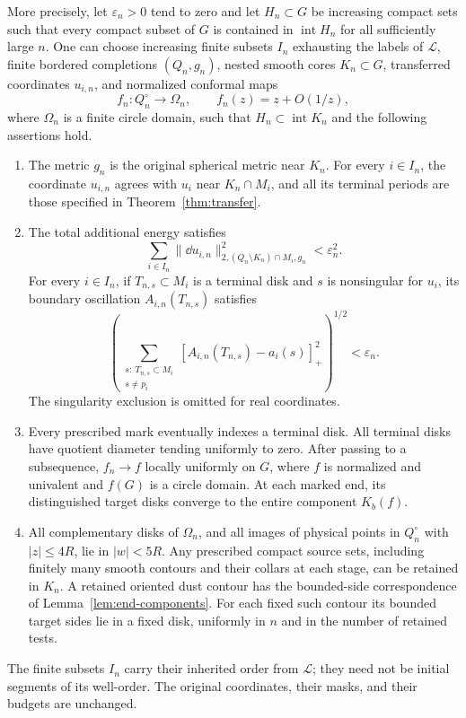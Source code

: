\begin{theorem}
More precisely, let $\varepsilon_n>0$ tend to zero and let
$H_n\subset G$ be increasing compact sets such that every compact subset
of $G$ is contained in $\operatorname{int}H_n$ for all sufficiently
large $n$.  One can choose increasing finite subsets $I_n$ exhausting
the labels of $\mathscr L$, finite bordered completions $(Q_n,g_n)$,
nested smooth cores $K_n\subset G$, transferred coordinates $u_{i,n}$,
and normalized conformal maps
\[
 f_n:Q_n^\circ\longrightarrow\Omega_n,
 \qquad f_n(z)=z+O(1/z),
\]
where $\Omega_n$ is a finite circle domain, such that $H_n\subset
\operatorname{int}K_n$ and the following assertions hold.
\begin{enumerate}[label=\textup{(\roman*)}]
\item The metric $g_n$ is the original spherical metric near $K_n$.
For every $i\in I_n$, the coordinate $u_{i,n}$ agrees with $u_i$ near
$K_n\cap M_i$, and all its terminal periods are those specified in
Theorem~\ref{thm:transfer}.
\item The total additional energy satisfies
\begin{equation}\label{eq:retained-total-tail}
 \sum_{i\in I_n}
 \|\dd u_{i,n}\|_{2,(Q_n\setminus K_n)\cap M_i,g_n}^2
 <\varepsilon_n^2.
\end{equation}
For every $i\in I_n$, if $T_{n,s}\subset M_i$ is a terminal disk
and $s$ is nonsingular for $u_i$,
its boundary oscillation $A_{i,n}(T_{n,s})$ satisfies
\begin{equation}\label{eq:retained-excess-oscillation}
 \left(\sum_{\substack{s:\ T_{n,s}\subset M_i\\s\ne p_i}}
 [A_{i,n}(T_{n,s})-a_i(s)]_+^2\right)^{1/2}
 <\varepsilon_n.
\end{equation}
The singularity exclusion is omitted for real coordinates.
\item Every prescribed mark eventually indexes a terminal disk.
All terminal disks have quotient diameter tending uniformly to zero.
After passing to a subsequence, $f_n\to f$ locally uniformly on $G$,
where $f$ is normalized and univalent and $f(G)$ is a circle domain.
At each marked end, its distinguished target disks converge to the
entire component $K_b(f)$.
\item All complementary disks of $\Omega_n$, and all images of
physical points in $Q_n^\circ$ with $|z|\le4R$, lie in $|w|<5R$.  Any prescribed
compact source sets, including finitely many smooth contours and
their collars at each stage, can be retained in $K_n$.  A retained
oriented dust contour has the bounded-side correspondence of
Lemma~\ref{lem:end-components}.  For each fixed such contour its
bounded target sides lie in a fixed disk, uniformly in $n$ and in
the number of retained tests.
\end{enumerate}
The finite subsets $I_n$ carry their inherited order from
$\mathscr L$; they need not be initial segments of its well-order.
The original coordinates, their masks, and their budgets are unchanged.
\end{theorem}

